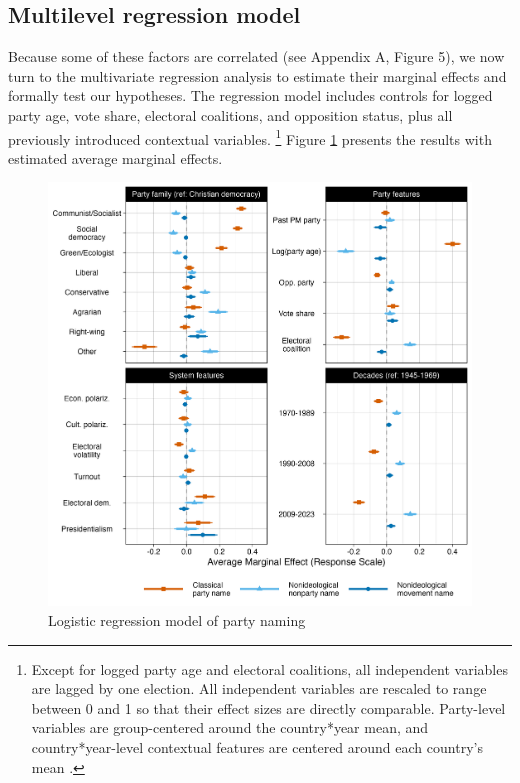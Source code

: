 \documentclass[12pt]{article}
\begin{document}
\subsection{Multilevel regression model}

Because some of these factors are correlated (see Appendix A, Figure 5), we now turn to the multivariate regression analysis to estimate their marginal effects and formally test our hypotheses. The regression model includes controls for logged party age, vote share, electoral coalitions, and opposition status, plus all previously introduced contextual variables. \footnote{Except for logged party age and electoral coalitions, all independent variables are lagged by one election. All independent variables are rescaled to range between 0 and 1 so that their effect sizes are directly comparable. Party-level variables are group-centered around the country*year mean, and country*year-level contextual features are centered around each country's mean \citep{Enders_Tofighi_2007}.} Figure \ref{Fig:mlm_results} presents the results with estimated average marginal effects.

\begin{figure}[H] 
\includegraphics[width=\textwidth]{./figures/Figure4.png} 
\caption{Logistic regression model of party naming} 
\label{Fig:mlm_results} 
\end{figure}
\end{document}
